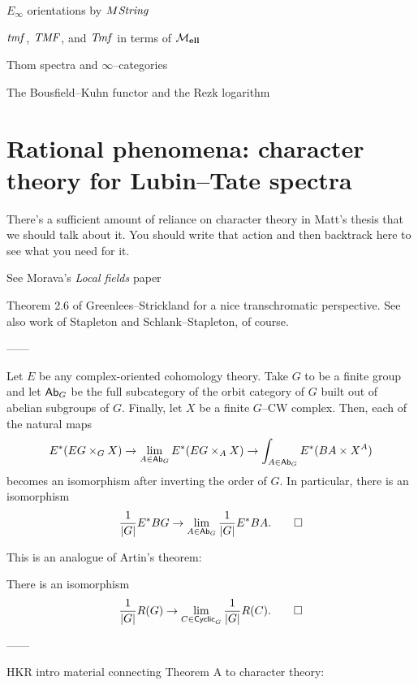 $E_\infty$ orientations by $M\mathit{String}$

$\mathit{tmf}$, $\mathit{TMF}$, and $\mathit{Tmf}$ in terms of $\mathcal{M}_{\mathbf{ell}}$

Thom spectra and $\infty$--categories

The Bousfield--Kuhn functor and the Rezk logarithm





\section{Rational phenomena: character theory for Lubin--Tate spectra}

There's a sufficient amount of reliance on character theory in Matt's thesis that we should talk about it.  You should write that action and then backtrack here to see what you need for it.

See Morava's \textit{Local fields} paper

\begin{remark}
Theorem 2.6 of Greenlees--Strickland for a nice transchromatic perspective.  See also work of Stapleton and Schlank--Stapleton, of course.
\end{remark}


------

\begin{theorem}
Let $E$ be any complex-oriented cohomology theory.  Take $G$ to be a finite group and let $\mathsf{Ab}_G$ be the full subcategory of the orbit category of $G$ built out of abelian subgroups of $G$.  Finally, let $X$ be a finite $G$--CW complex.  Then, each of the natural maps \[E^*(EG \times_G X) \to \lim_{A \in \mathsf{Ab}_G} E^*(EG \times_A X) \to \int_{A \in \mathsf{Ab}_G} E^*(BA \times X^A)\] becomes an isomorphism after inverting the order of $G$.  In particular, there is an isomorphism \[\frac{1}{|G|} E^* BG \to \lim_{A \in \mathsf{Ab}_G} \frac{1}{|G|} E^* BA. \qed\]
\end{theorem}

This is an analogue of Artin's theorem:
\begin{theorem}
There is an isomorphism \[\frac{1}{|G|} R(G) \to \lim_{C \in \mathsf{Cyclic}_G} \frac{1}{|G|} R(C). \qed\]
\end{theorem}


------

HKR intro material connecting Theorem A to character theory:

